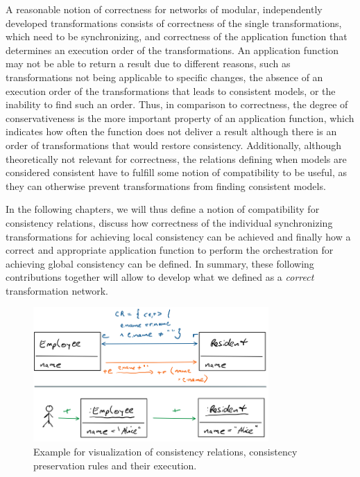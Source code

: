 \begin{insight}
    A reasonable notion of correctness for networks of modular, independently developed transformations consists of correctness of the single transformations, which need to be synchronizing, and correctness of the application function that determines an execution order of the transformations.
    An application function may not be able to return a result due to different reasons, such as transformations not being applicable to specific changes, the absence of an execution order of the transformations that leads to consistent models, or the inability to find such an order.
    Thus, in comparison to correctness, the degree of conservativeness is the more important property of an application function, which indicates how often the function does not deliver a result although there is an order of transformations that would restore consistency.
    Additionally, although theoretically not relevant for correctness, the relations defining when models are considered consistent have to fulfill some notion of compatibility to be useful, as they can otherwise prevent transformations from finding consistent models.
\end{insight}

In the following chapters, we will thus define a notion of compatibility for consistency relations, discuss how correctness of the individual synchronizing transformations for achieving local consistency can be achieved and finally how a correct and appropriate application function to perform the orchestration for achieving global consistency can be defined.
In summary, these following contributions together will allow to develop what we defined as a \emph{correct} transformation network.

\begin{figure}
    \centering
    \includegraphics[width=0.8\textwidth]{figures/correctness/notion/visualization_example.png}
    \caption[Example for concept visualizations]{Example for visualization of consistency relations, consistency preservation rules and their execution.}
    \label{fig:correctness:visualization_example}
\end{figure}

